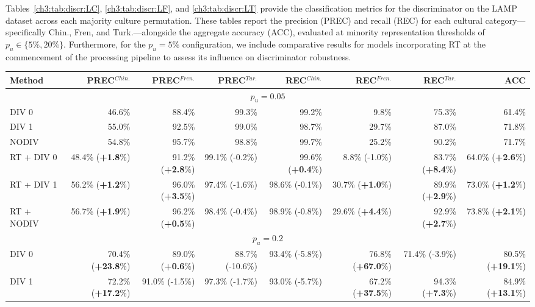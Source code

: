 Tables~\ref{ch3:tab:discr:LC}, \ref{ch3:tab:discr:LF}, and \ref{ch3:tab:discr:LT} provide the classification metrics for the discriminator on the LAMP dataset across each majority culture permutation. 
These tables report the precision (PREC) and recall (REC) for each cultural category—specifically Chin., Fren, and Turk.—alongside the aggregate accuracy (ACC), evaluated at minority representation thresholds of $p_u \in \{5\%, 20\%\}$. 
Furthermore, for the $p_u = 5\%$ configuration, we include comparative results for models incorporating RT at the commencement of the processing pipeline to assess its influence on discriminator robustness.
%
\begin{table}
\centering
\scriptsize
\setlength{\tabcolsep}{0.1cm}
\begin{tabular}{lrrrrrrr}
\toprule
\textbf{Method} & \textbf{PREC}$^{Chin.}$  & \textbf{PREC}$^{Fren.}$ & \textbf{PREC}$^{Tur.}$ & \textbf{REC}$^{Chin.}$ & \textbf{REC}$^{Fren.}$ & \textbf{REC}$^{Tur.}$ &  \textbf{ACC}\\
\midrule
\multicolumn{8}{c}{$p_u=0.05$} \\
\midrule
DIV 0 & 46.6\%	&	88.4\%&	99.3\%	&	99.2\%&	9.8\%&	75.3\%	&	61.4\%\\	
DIV 1 & 55.0\%	&	92.5\%&	99.0\%&	98.7\%&	29.7\%&	87.0\%	&	71.8\%\\	
NODIV & 54.8\%	&	95.7\%&	98.8\%	&	99.7\%&	25.2\%&	90.2\%	&	71.7\%\\
\midrule
RT + DIV 0      & 48.4\% (\textbf{+1.8}\%) & 91.2\% (\textbf{+2.8}\%) & 99.1\% (-0.2\%) & 99.6\% (\textbf{+0.4}\%) & 8.8\% (-1.0\%) & 83.7\% (\textbf{+8.4}\%) & 64.0\% (\textbf{+2.6}\%) \\
RT + DIV 1      & 56.2\% (\textbf{+1.2}\%) & 96.0\% (\textbf{+3.5}\%) & 97.4\% (-1.6\%) & 98.6\% (-0.1\%) & 30.7\% (\textbf{+1.0}\%) & 89.9\% (\textbf{+2.9}\%) & 73.0\% (\textbf{+1.2}\%) \\
RT + NODIV      & 56.7\% (\textbf{+1.9}\%) & 96.2\% (\textbf{+0.5}\%) & 98.4\% (-0.4\%) & 98.9\% (-0.8\%) & 29.6\% (\textbf{+4.4}\%) & 92.9\% (\textbf{+2.7}\%) & 73.8\% (\textbf{+2.1}\%) \\
\midrule
\multicolumn{8}{c}{$p_u=0.2$} \\
\midrule
DIV 0           & 70.4\% (\textbf{+23.8}\%) & 89.0\% (\textbf{+0.6}\%) & 88.7\% (-10.6\%) & 93.4\% (-5.8\%) & 76.8\% (\textbf{+67.0}\%) & 71.4\% (-3.9\%) & 80.5\% (\textbf{+19.1}\%) \\
DIV 1           & 72.2\% (\textbf{+17.2}\%) & 91.0\% (-1.5\%) & 97.3\% (-1.7\%) & 93.0\% (-5.7\%) & 67.2\% (\textbf{+37.5}\%) & 94.3\% (\textbf{+7.3}\%) & 84.9\% (\textbf{+13.1}\%) \\

\end{tabular}
\end{table}
